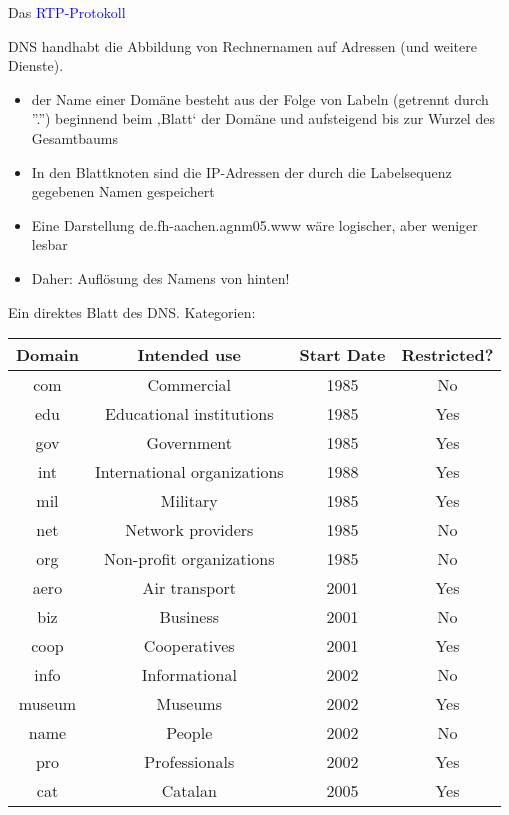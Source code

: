 Das \textcolor{blue}{RTP-Protokoll}

DNS handhabt die Abbildung von Rechnernamen auf Adressen (und weitere Dienste).

\begin{itemize}
    \item der Name einer Domäne besteht aus der Folge von Labeln (getrennt durch ''.'') beginnend beim ‚Blatt‘ der Domäne und aufsteigend bis zur Wurzel des Gesamtbaums
    \item In den Blattknoten sind die IP-Adressen der durch die Labelsequenz gegebenen Namen gespeichert
    \item Eine Darstellung de.fh-aachen.agnm05.www wäre logischer, aber weniger lesbar
    \item Daher: Auflösung des Namens von hinten!
\end{itemize}

Ein direktes Blatt des DNS. Kategorien:
\begin{center}
    \begin{tabular}{|c|c|c|c|}
        \hline
        Domain & Intended use & Start Date & Restricted? \tabularnewline
        \hline
        com & Commercial & 1985 & No \tabularnewline
        \hline
        edu & Educational institutions & 1985 & Yes \tabularnewline
        \hline
        gov & Government & 1985 & Yes \tabularnewline
        \hline
        int & International organizations & 1988 & Yes \tabularnewline
        \hline
        mil & Military & 1985 & Yes \tabularnewline
        \hline
        net & Network providers & 1985 & No \tabularnewline
        \hline
        org & Non-profit organizations & 1985 & No \tabularnewline
        \hline
        aero & Air transport & 2001 & Yes \tabularnewline
        \hline
        biz & Business & 2001 & No \tabularnewline
        \hline
        coop & Cooperatives & 2001 & Yes \tabularnewline
        \hline
        info & Informational & 2002 & No \tabularnewline
        \hline
        museum & Museums & 2002 & Yes \tabularnewline
        \hline
        name & People & 2002 & No \tabularnewline
        \hline
        pro & Professionals & 2002 & Yes \tabularnewline
        \hline
        cat & Catalan & 2005 & Yes \tabularnewline
        \hline
    \end{tabular}
\end{center}


